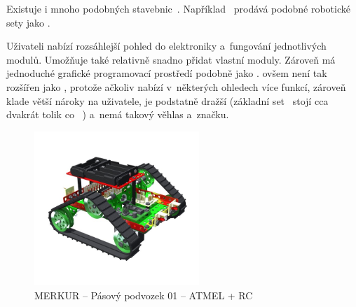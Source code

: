 
Existuje i mnoho podobných stavebnic~\cite{intorobotics_BestAlternativesToLegoMindstormsKits}. 
Například \fischerT ~prodává podobné robotické sety jako \lego{~}\cite{fischertechnik_ROBOTICS}. 

Uživateli nabízí rozsáhlejší pohled do elektroniky a~fungování jednotlivých modulů. 
Umožňuje také relativně snadno přidat vlastní moduly.
Zároveň má jednoduché grafické programovací prostředí podobně jako \lego. 
\FischerT{ }ovšem není tak rozšířen jako \legoM, protože ačkoliv nabízí v~některých ohledech více funkcí, zároveň klade větší nároky na uživatele, je podstatně dražší (základní set~\cite{fischertechnik_HelagoEshop_ROBOTICS-TXT-COMPETITION-SET} stojí cca dvakrát tolik co ~\cite{lego_eduxeEshop_CoreSet}) a~nemá takový věhlas a~značku.



\begin{figure}[h]
	\centering
	\includegraphics[width=235px]{images/MERKUR_Pasovy-podvozek-01_ATMEL+RC.jpg}
	\caption[MERKUR -- Pásový podvozek 01 -- ATMEL + RC]{MERKUR -- Pásový podvozek 01 -- ATMEL + RC\protect\footnotemark}
	\label{fig:MERKUR_Pasovy-podvozek-01_ATMEL+RC}
\end{figure}

